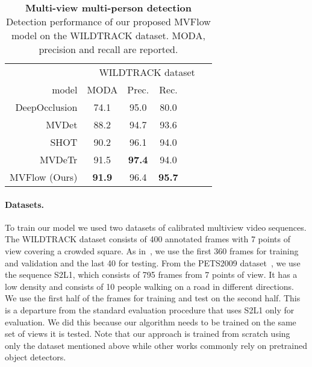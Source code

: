 \documentclass[10pt,twocolumn,letterpaper]{article}
\begin{document}
\begin{table}[h]
    \begin{center}
    \begin{tabular}{r  c c c   c c c } \toprule
    

    &  \multicolumn{6}{c}{WILDTRACK dataset}  \\ \cmidrule(lr{.75em}){2-7}
    model & MODA & Prec. & Rec.  \\ \midrule
    DeepOcclusion \cite{Chavdarova18a} & 74.1 & 95.0 & 80.0 \\
    MVDet \cite{hou2020multiview} & 88.2 & 94.7 & 93.6   \\
    SHOT \cite{song2021stacked} & 90.2 & 96.1 & 94.0   \\
    MVDeTr \cite{hou2021multiview} & 91.5 & \textbf{97.4} & 94.0   \\
    MVFlow (Ours) & \textbf{91.9} & 96.4 & \textbf{95.7}  \\
    \bottomrule
    \end{tabular}
    \end{center}
      \caption{\textbf{Multi-view multi-person detection}  Detection performance of our proposed MVFlow model on the WILDTRACK dataset. MODA, precision and recall are reported.
      }  
     \label{tab:mvmdetection}
    \end{table} 
\paragraph{Datasets.}

To train our model we used two datasets of calibrated multiview video sequences. The WILDTRACK dataset \cite{Chavdarova18a} consists of 400 annotated frames with 7 points of view covering a crowded square. As in~\cite{Chavdarova18a}, we use the first 360 frames for training and validation and the last 40 for testing. From the PETS2009 dataset~\cite{Ferryman09a}, we use the sequence S2L1, which consists of 795 frames from 7 points of view. It has a low density and consists of 10 people walking on a road in different directions. We use the first half of the frames for training and test on the second half. This is a departure from the standard evaluation procedure that uses S2L1 only for evaluation. We did this because our algorithm needs to be trained on the same set of views it is tested. Note that our approach is trained from scratch using only the dataset mentioned above while other works commonly rely on pretrained object detectors.
\end{document}
